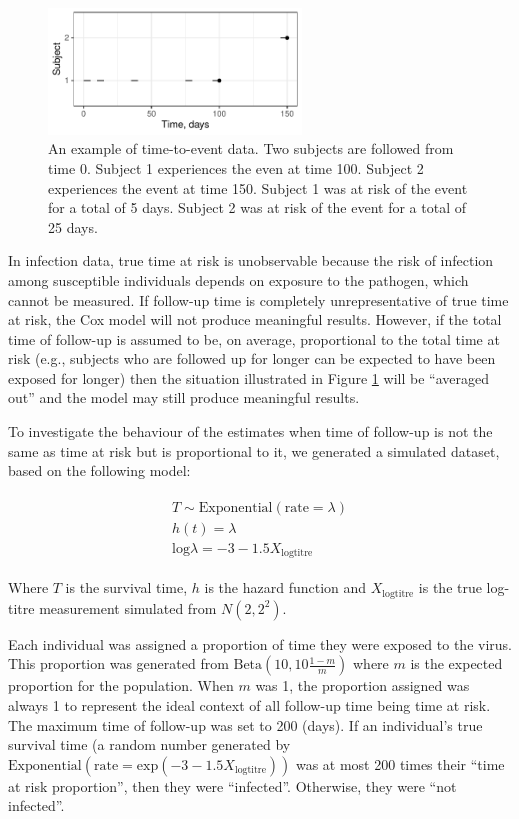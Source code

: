 \begin{figure}[htp]
	\centering
	\includegraphics[width=0.6\textwidth]{../curve-cox/timeplot_2_light.pdf}
	\caption{
	An example of time-to-event data. Two subjects are followed from time 0. Subject 1 experiences the even at time 100. Subject 2 experiences the event at time 150. Subject 1 was at risk of the event for a total of 5 days. Subject 2 was at risk of the event for a total of 25 days.
	}
	\label{CoxExamplePartial}
\end{figure}

In infection data, true time at risk is unobservable because the risk of infection among susceptible individuals depends on exposure to the pathogen, which cannot be measured. If follow-up time is completely unrepresentative of true time at risk, the Cox model will not produce meaningful results. However, if the total time of follow-up is assumed to be, on average, proportional to the total time at risk (e.g., subjects who are followed up for longer can be expected to have been exposed for longer) then the situation illustrated in Figure  \ref{CoxExamplePartial} will be ``averaged out'' and the model may still produce meaningful results.

To investigate the behaviour of the estimates when time of follow-up is not the same as time at risk but is proportional to it, we generated a simulated dataset, based on the following model:

\begin{align*}
\begin{gathered}
T \sim \text{Exponential}(\text{rate} = \lambda) \\
h(t) = \lambda \\
\text{log}\lambda = -3 - 1.5 X_{\text{logtitre}}
\end{gathered}
\end{align*}

Where $T$ is the survival time, $h$ is the hazard function and $X_{\text{logtitre}}$ is the true log-titre measurement simulated from $N(2, 2^2)$.

Each individual was assigned a proportion of time they were exposed to the virus. This proportion was generated from $\text{Beta}(10, 10\frac{1-m}{m})$ where $m$ is the expected proportion for the population. When $m$ was 1, the proportion assigned was always 1 to represent the ideal context of all follow-up time being time at risk. The maximum time of follow-up was set to 200 (days). If an individual's true survival time (a random number generated by $\text{Exponential}(\text{rate} = \text{exp}(-3 - 1.5 X_{\text{logtitre}}) )$ was at most 200 times their ``time at risk proportion'', then they were ``infected''. Otherwise, they were ``not infected''. 

